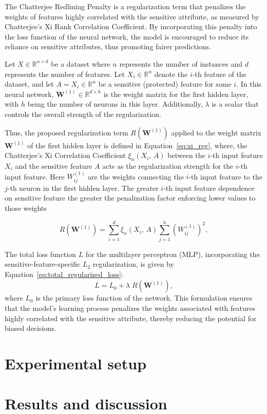 The Chatterjee Redlining Penalty is a regularization term that penalizes the weights of features highly correlated with the sensitive attribute, as measured by Chatterjee's Xi Rank Correlation Coefficient. By incorporating this penalty into the loss function of the neural network, the model is encouraged to reduce its reliance on sensitive attributes, thus promoting fairer predictions.

Let $X \in \mathbb{R}^{n \times d}$ be a dataset where $n$ represents the number of instances and $d$ represents the number of features. Let $X_i \in \mathbb{R}^n$ denote the $i$-th feature of the dataset, and let $A = X_i \in \mathbb{R}^n$ be a sensitive (protected) feature for some $i$. In this neural network, $\mathbf{W}^{(1)} \in \mathbb{R}^{d \times h}$ is the weight matrix for the first hidden layer, with $h$ being the number of neurons in this layer. Additionally, $\lambda$ is a scalar that controls the overall strength of the regularization.

Thus, the proposed regularization term $R(\mathbf{W}^{(1)})$ applied to the weight matrix $\mathbf{W}^{(1)}$ of the first hidden layer is defined in Equation~\ref{eq:xi_reg}, where, the Chatterjee's Xi Correlation Coefficient $\xi_n(X_i,\,A)$ between the $i$-th input feature $X_i$ and the sensitive feature $A$ acts as the regularization strength for the $i$-th input feature. Here $W^{(1)}_{ij}$ are the weights connecting the $i$-th input feature to the $j$-th neuron in the first hidden layer. The greater $i$-th input feature dependence on sensitive feature the greater the penalization factor enforcing lower values to those weights

\begin{equation}\label{eq:xi_reg}
R(\mathbf{W}^{(1)}) = \sum_{i=1}^d \xi_n(X_i,\,A) \sum_{j=1}^h (W^{(1)}_{ij})^2,
\end{equation}


The total loss function $L$ for the multilayer perceptron (MLP), incorporating the sensitive-feature-specific $L_2$ regularization, is given by Equation~\ref{eq:total_regularized_loss}:
\begin{equation}\label{eq:total_regularized_loss}
L = L_0 + \lambda \; R(\mathbf{W}^{(1)}),
\end{equation}
where $L_0$ is the primary loss function of the network. This formulation ensures that the model's learning process penalizes the weights associated with features highly correlated with the sensitive attribute, thereby reducing the potential for biased decisions.


\section{Experimental setup}

\section{Results and discussion}
